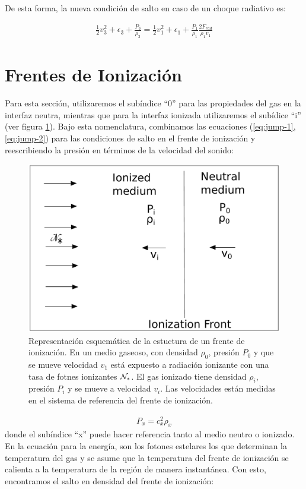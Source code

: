 De esta forma, la nueva condición de salto en caso de un choque radiativo es:

\begin{align}
  \frac{1}{2}v^2_3 + \epsilon_3 + \frac{P_3}{\rho_3} = \frac{1}{2}v^2_1 + \epsilon_1 + \frac{P_1}{\rho_1} \frac{2F_{rad}}{\rho_1v_1}\label{eq:jump-rad}
\end{align}


\section{Frentes de Ionización}
\label{app:ionization-front}
Para esta sección, utilizaremos el subíndice ``0'' para las propiedades del gas en la interfaz neutra, mientras que para la interfaz ionizada utilizaremos el subídice ``i'' (ver figura \ref{fig:IF}). Bajo esta nomenclatura, combinamos las ecuaciones (\ref{eq:jump-1}, \ref{eq:jump-2}) para las condiciones de salto en el frente de ionización y reescribiendo la presión en términos de la velocidad del sonido:

\begin{figure}
  \centering
  \includegraphics[width=0.8\linewidth]{./Figures/IF}
  \caption[Esquema de la esructura de un frente de ionización.]{Representación esquemática de la estuctura de un frente de ionización. En un medio gaseoso, con densidad $\rho_0$, presión $P_0$ y que se mueve velocidad $v_1$ está expuesto a radiación ionizante con una tasa de fotnes ionizantes $\mathcal{N}_*$. El gas ionizado tiene densidad $\rho_i$, presión $P_i$ y se mueve a velocidad $v_i$. Las velocidades están medidas en el sistema de referencia del frente de ionización.}
  \label{fig:IF}
\end{figure}

\begin{align}
  P_x = c^2_x\rho_x
\end{align}
donde el subíndice ``x'' puede hacer referencia tanto al medio neutro o ionizado.
En la ecuación para la energía, son los fotones estelares los que determinan la temperatura del gas y se asume que la temperatura del frente de ionización se calienta a la temperatura de la región  de manera instantánea. Con esto, encontramos el salto en densidad del frente de ionización:

